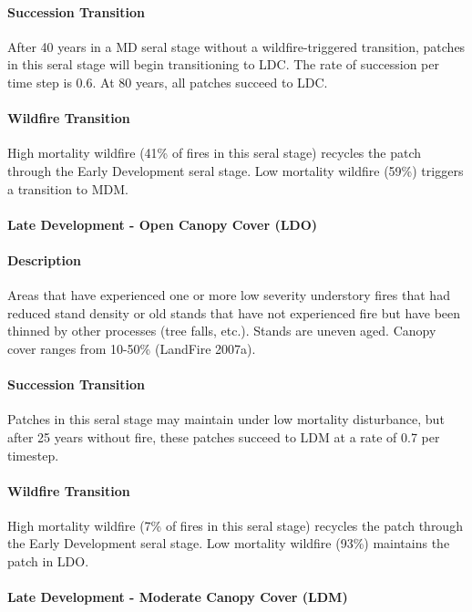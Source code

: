 \paragraph{Succession Transition} After 40 years in a MD seral stage without a wildfire-triggered transition, patches in this seral stage will begin transitioning to LDC. The rate of succession per time step is 0.6. At 80 years, all patches succeed to LDC.

\paragraph{Wildfire Transition} High mortality wildfire (41\% of fires in this seral stage) recycles the patch through the Early Development seral stage. Low mortality wildfire (59\%) triggers a transition to MDM.

\noindent\hrulefill


\paragraph{Late Development - Open Canopy Cover (LDO)}

\paragraph{Description} Areas that have experienced one or more low severity understory fires that had reduced stand density or old stands that have not experienced fire but have been thinned by other processes (tree falls, etc.). Stands are uneven aged. Canopy cover ranges from 10-50\% (LandFire 2007a).

\paragraph{Succession Transition} Patches in this seral stage may maintain under low mortality disturbance, but after 25 years without fire, these patches succeed to LDM at a rate of 0.7 per timestep.

\paragraph{Wildfire Transition} High mortality wildfire (7\% of fires in this seral stage) recycles the patch through the Early Development seral stage. Low mortality wildfire (93\%) maintains the patch in LDO.

\noindent\hrulefill

\paragraph{Late Development - Moderate Canopy Cover (LDM)}


